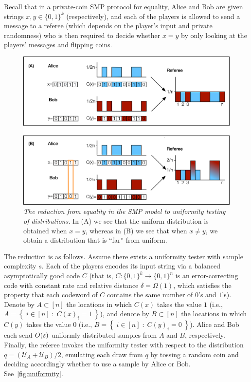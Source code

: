 \documentclass[11pt]{article}
\theoremstyle{remark}   	\newtheorem{remark}[theorem]{Remark}
\theoremstyle{definition}   	\newaliascnt{defn}{theorem}
\newcommand{\bigO}[1]{{O\mleft( #1 \mright)}}
\newcommand{\setOfSuchThat}[2]{ \left\{\; #1 \;\colon\; #2\; \right\} } 			\newcommand{\indicSet}[1]{\mathds{1}_{#1}}                                              \newcommand{\indic}[1]{\indicSet{\left\{#1\right\}}}                                             \newcommand{\disjunion}{\amalg}
\newcommand{\uniform}{\ensuremath{\mathcal{U}}}
\newcommand{\bitset}{\ensuremath{\{0,1\}}}
\begin{document}
 Recall that in a private-coin SMP protocol for equality, Alice and Bob are given strings $x,y \in \bitset^k$ (respectively), and each of the players is allowed to send a message to a referee (which depends on the player's input and private randomness) who is then required to decide whether $x=y$ by only looking at the players' messages and flipping coins.
 
 \begin{figure}[ht!]
  \centering
  \includegraphics[scale=0.8]{img_uniformity.png}
  \caption{\emph{The reduction from equality in the SMP model to uniformity testing of distributions.} In (A) we see that the uniform distribution is obtained when $x=y$, whereas in (B) we see that when $x \neq y$, we obtain a distribution that is ``far'' from uniform.}
  \label{fig:uniformity}
\end{figure}

The reduction is as follows. Assume there exists a uniformity tester with sample complexity $s$. Each of the players encodes its input string via a balanced asymptotically good code $C$ (that is, $C\colon\bitset^k \to \bitset^n$ is an error-correcting code with constant rate and relative distance $\delta = \Omega(1)$, which satisfies the property that each codeword of $C$ contains the same number of $0$'s and $1$'s). Denote by $A \subset [n]$ the locations in which $C(x)$ takes the value $1$ (i.e., $A = \setOfSuchThat{ i\in[n] }{ C(x)_i = 1 }$), and denote by $B \subset [n]$ the locations in which $C(y)$ takes the value $0$ (i.e., $B = \setOfSuchThat{ i\in[n] }{ C(y)_i = 0 }$). Alice and Bob each send $\bigO{s}$ uniformly distributed samples from $A$ and $B$, respectively. Finally, the referee invokes the uniformity tester with respect to the distribution $q= \left( \uniform_{A}+ \uniform_{B} \right)/2$, emulating each draw from $q$ by tossing a random coin and deciding accordingly whether to use a sample by Alice or Bob. See~\autoref{fig:uniformity}.
\end{document}
